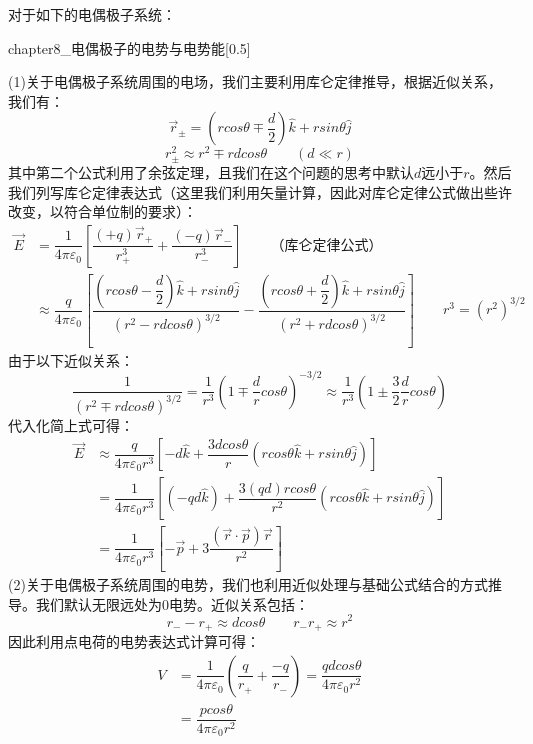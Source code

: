 \begin{prove}
    对于如下的电偶极子系统：
    \begin{singlefigure}[电偶极子系统示意图]{chapter8_电偶极子的电势与电势能}[0.5]
    \end{singlefigure}
    (1)关于电偶极子系统周围的电场，我们主要利用库仑定律推导，根据近似关系，我们有：
    \[\vec{r}_{\pm}=(rcos\theta\mp\dfrac{d}{2})\hat{k}+rsin\theta\hat{j}\]
    \[r_{\pm}^2 \approx r^2\mp rdcos\theta\qquad(d\ll r)\]
    其中第二个公式利用了余弦定理，且我们在这个问题的思考中默认$d$远小于$r$。然后我们列写库仑定律表达式（这里我们利用矢量计算，因此对库仑定律公式做出些许改变，以符合单位制的要求）：
    \begin{align*}
        \vec{E} &= \dfrac{1}{4\pi\varepsilon_0}[\dfrac{(+q)\vec{r}_{+}}{r_{+}^3}+\dfrac{(-q)\vec{r}_{-}}{r_{-}^3}]\qquad\text{（库仑定律公式）}\\
            &\approx \dfrac{q}{4\pi\varepsilon_0}[\dfrac{(rcos\theta-\dfrac{d}{2})\hat{k}+rsin\theta\hat{j}}{(r^2 -rdcos\theta)^{3/2}}-\dfrac{(rcos\theta+\dfrac{d}{2})\hat{k}+rsin\theta\hat{j}}{(r^2 +rdcos\theta)^{3/2}}]\qquad\text{$r^3=(r^2)^{3/2}$}
    \end{align*}
    由于以下近似关系：
    \[\dfrac{1}{(r^2\mp rdcos\theta)^{3/2}}=\dfrac{1}{r^3}(1\mp \dfrac{d}{r}cos\theta)^{-3/2}\approx\dfrac{1}{r^3}(1\pm \dfrac{3}{2}\dfrac{d}{r}cos\theta)\]
    代入化简上式可得：
    \begin{align*}
        \vec{E} &\approx \dfrac{q}{4\pi\varepsilon_0 r^3}[-d\hat{k}+\dfrac{3dcos\theta}{r}(rcos\theta\hat{k}+rsin\theta\hat{j})] \\
            &= \dfrac{1}{4\pi\varepsilon_0 r^3}[(-qd\hat{k})+\dfrac{3(qd)r cos\theta}{r^2}(rcos\theta\hat{k}+rsin\theta\hat{j})]\\
            &= \dfrac{1}{4\pi\varepsilon_0 r^3}[-\vec{p}+3\dfrac{(\vec{r}\cdot\vec{p})\vec{r}}{r^2}]
    \end{align*}
    (2)关于电偶极子系统周围的电势，我们也利用近似处理与基础公式结合的方式推导。我们默认无限远处为0电势。近似关系包括：
    \[r_{-}-r_{+} \approx dcos\theta \qquad r_{-}r_{+}\approx r^2\]
    因此利用点电荷的电势表达式计算可得：
    \begin{align*}
        V &= \dfrac{1}{4\pi\varepsilon_0}(\dfrac{q}{r_{+}}+\dfrac{-q}{r_{-}})=\dfrac{qdcos\theta}{4\pi\varepsilon_0 r^2}\\
            &= \dfrac{pcos\theta}{4\pi\varepsilon_0 r^2}
    \end{align*}
\end{prove}

